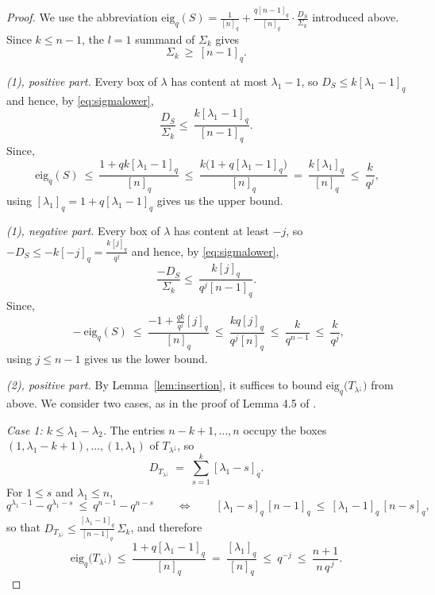 \documentclass[11pt]{article}
\theoremstyle{plain}  %
\newcommand{\eig}{\text{eig}} %
\begin{document}
\begin{proof}
We use the abbreviation $\eig_q(S) = \frac{1}{[n]_q}+\frac{q[n-1]_q}{[n]_q}\cdot
\frac{D_S}{\Sigma_k}$ introduced above. Since $k \le n-1$, the $l=1$ summand of $\Sigma_k$
gives
\begin{equation}\label{eq:sigmalower}
  \Sigma_k \ \ge\ [n-1]_q .
\end{equation}

\emph{(1), positive part.} Every box of $\lambda$ has content at most
$\lambda_1 - 1$, so $D_S \le k[\lambda_1-1]_q$ and hence, by
\eqref{eq:sigmalower},
$$
   \frac{D_S}{\Sigma_k}  \le\ \frac{k[\lambda_1-1]_q}{[n-1]_q}.
$$
Since,
$$
  \ \mathrm{eig}_q(S)
  \ \le\ \frac{1 + qk[\lambda_1-1]_q}{[n]_q}
  \ \le\ \frac{k\bigl(1 + q[\lambda_1-1]_q\bigr)}{[n]_q}
  \ =\ \frac{k[\lambda_1]_q}{[n]_q}
  \ \le\ \frac{k}{q^j},
$$
using $[\lambda_1]_q = 1 + q[\lambda_1-1]_q$ gives us the upper bound.

\emph{(1), negative part.} Every box of $\lambda$ has content at least 
$-j$, so $-D_S \le -k[-j]_q=\frac{k[j]_q}{q^j} $ and hence, by
\eqref{eq:sigmalower},
$$
   \frac{-D_S}{\Sigma_k}  \le\ \frac{k[j]_q}{q^j[n-1]_q}.
$$
Since,
$$
  \ -\mathrm{eig}_q(S)
  \ \le\ \frac{-1 + \frac{qk}{q^j}[j]_q}{[n]_q}
  \ \le\ \frac{k q[j]_q}{q^j[n]_q}
  \ \le\ \frac{k}{q^{n-1}}
  \ \le\ \frac{k}{q^{j}},
$$
using $j \leq n-1$ gives us the lower bound.

\emph{(2), positive part.} By Lemma~\ref{lem:insertion}, it suffices to bound
$\mathrm{eig}_q\bigl(T_{\lambda^{\downarrow}}\bigr)$ from above. We consider
two cases, as in the proof of Lemma 4.5 of \cite{arfaee2025shuffling}.

\emph{Case 1: $k \le \lambda_1 - \lambda_2$.} The entries
$n-k+1, \ldots, n$ occupy the boxes
$(1,\lambda_1-k+1), \ldots, (1,\lambda_1)$ of $T_{\lambda^{\downarrow}}$, so
$$
  D_{T_{\lambda^{\downarrow}}} \;=\; \sum_{s=1}^{k}[\lambda_1 - s]_q .
$$
For $1 \le s$ and $\lambda_1 \le n$,
$$
  q^{\lambda_1-1} - q^{\lambda_1-s}\ \le\ q^{n-1} - q^{n-s}
  \qquad\Longleftrightarrow\qquad
  [\lambda_1-s]_q\,[n-1]_q\ \le\ [\lambda_1-1]_q\,[n-s]_q ,
$$
so that $D_{T_{\lambda^{\downarrow}}} \le
\frac{[\lambda_1-1]_q}{[n-1]_q}\,\Sigma_k$, and therefore
$$
  \mathrm{eig}_q\bigl(T_{\lambda^{\downarrow}}\bigr)
  \ \le\ \frac{1 + q[\lambda_1-1]_q}{[n]_q}
  \ =\ \frac{[\lambda_1]_q}{[n]_q}
  \ \le\ q^{-j}
  \ \le\ \frac{n+1}{n\,q^{\,j}} .
$$


\end{proof}
\end{document}
